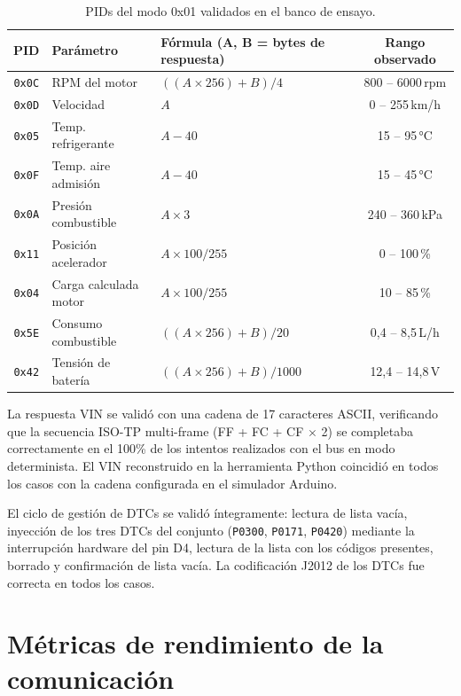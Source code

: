 \begin{table}[!htbp]
\caption{PIDs del modo 0x01 validados en el banco de ensayo.}
\label{tab:pids_validados}
\centering
\renewcommand{\arraystretch}{1.2}
\begin{tabular}{|c|l|l|c|}
\hline
\textbf{PID} & \textbf{Parámetro} & \textbf{Fórmula (A, B = bytes de respuesta)} & \textbf{Rango observado} \\
\hline
\texttt{0x0C} & RPM del motor & $((A \times 256) + B) / 4$ & 800 -- 6000\,rpm \\
\texttt{0x0D} & Velocidad & $A$ & 0 -- 255\,km/h \\
\texttt{0x05} & Temp. refrigerante & $A - 40$ & 15 -- 95\,°C \\
\texttt{0x0F} & Temp. aire admisión & $A - 40$ & 15 -- 45\,°C \\
\texttt{0x0A} & Presión combustible & $A \times 3$ & 240 -- 360\,kPa \\
\texttt{0x11} & Posición acelerador & $A \times 100 / 255$ & 0 -- 100\,\% \\
\texttt{0x04} & Carga calculada motor & $A \times 100 / 255$ & 10 -- 85\,\% \\
\texttt{0x5E} & Consumo combustible & $((A \times 256) + B) / 20$ & 0,4 -- 8,5\,L/h \\
\texttt{0x42} & Tensión de batería & $((A \times 256) + B) / 1000$ & 12,4 -- 14,8\,V \\
\hline
\end{tabular}
\end{table}

La respuesta VIN se validó con una cadena de 17 caracteres ASCII, verificando que la secuencia ISO-TP multi-frame (FF + FC + CF $\times$ 2) se completaba correctamente en el 100\% de los intentos realizados con el bus en modo determinista. El VIN reconstruido en la herramienta Python coincidió en todos los casos con la cadena configurada en el simulador Arduino.

El ciclo de gestión de DTCs se validó íntegramente: lectura de lista vacía, inyección de los tres DTCs del conjunto (\texttt{P0300}, \texttt{P0171}, \texttt{P0420}) mediante la interrupción hardware del pin D4, lectura de la lista con los códigos presentes, borrado y confirmación de lista vacía. La codificación J2012 de los DTCs fue correcta en todos los casos.


\section{Métricas de rendimiento de la comunicación}
\label{sec:resultados_rendimiento}

